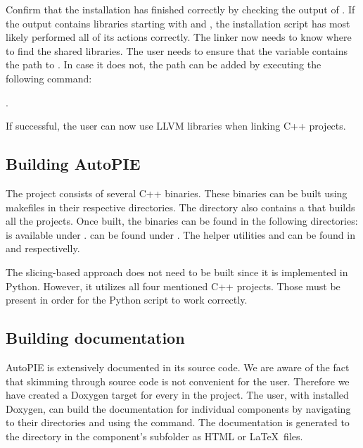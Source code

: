 \documentclass[12pt,a4paper]{report}
\begin{document}
Confirm that the installation has finished correctly by checking the output 
of . 
If the output contains libraries starting with  and 
, the installation script has most likely performed all of 
its actions correctly. 
The linker now needs to know where to find the shared libraries. 
The user needs to ensure that the  variable contains 
the path to . 
In case it does not, the path can be added by executing the following command:

.

If successful, the user can now use LLVM libraries when linking C++ projects.

\subsection{Building AutoPIE}

The project consists of several C++ binaries. 
These binaries can be built using makefiles in their respective directories. 
The  directory also contains a  that builds 
all the projects. 
Once built, the binaries can be found in the following directories:
 is available under 
.
 can be found under 
.
The helper utilities  and  can 
be found in 
and  
respectivelly.

The slicing-based approach does not need to be built since it is implemented 
in Python. 
However, it utilizes all four mentioned C++ projects. 
Those must be present in order for the Python script to work correctly.

\subsection{Building documentation}

AutoPIE is extensively documented in its source code. 
We are aware of the fact that skimming through source code is not convenient 
for the user. 
Therefore we have created a Doxygen target for every  in 
the project. 
The user, with installed Doxygen, can build the documentation for individual 
components by navigating to their directories and using 
the  command. 
The documentation is generated to the  directory in 
the component's subfolder as HTML or \LaTeX~files.
\end{document}
